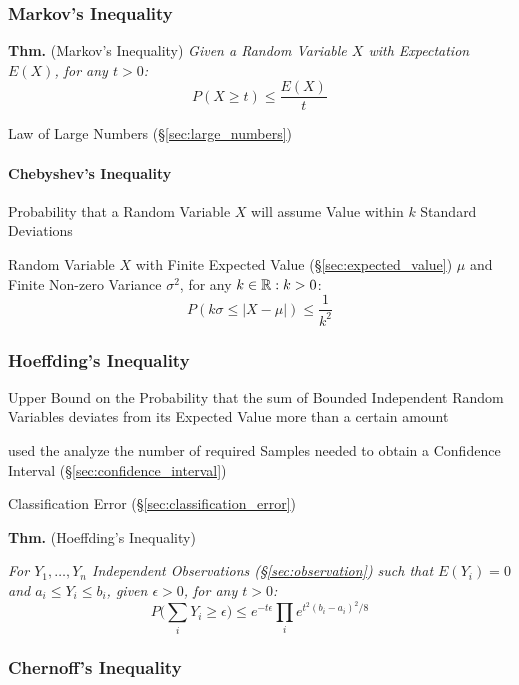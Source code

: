 \subsubsection{Markov's Inequality}\label{sec:markovs_inequality}

\textbf{Thm.} (Markov's Inequality) \emph{
  Given a Random Variable $X$ with Expectation $E(X)$, for any $t > 0$:
  \[
    P(X \geq t) \leq \frac{E(X)}{t}
  \]
}

Law of Large Numbers (\S\ref{sec:large_numbers})



\paragraph{Chebyshev's Inequality}\label{sec:chebyshevs_inequality}\hfill

Probability that a Random Variable $X$ will assume Value within $k$ Standard
Deviations

Random Variable $X$ with Finite Expected Value (\S\ref{sec:expected_value})
$\mu$ and Finite Non-zero Variance $\sigma^2$, for any $k \in \mathbb{R} : k > 0$:
\[
  P(k\sigma \leq |X - \mu|) \leq \frac{1}{k^2}
\]



\subsubsection{Hoeffding's Inequality}\label{sec:hoeffdings_inequality}

Upper Bound on the Probability that the sum of Bounded Independent Random
Variables deviates from its Expected Value more than a certain amount

used the analyze the number of required Samples needed to obtain a Confidence
Interval (\S\ref{sec:confidence_interval})

\fist Classification Error (\S\ref{sec:classification_error})

\textbf{Thm.} (Hoeffding's Inequality)

\emph{
  For $Y_1, \ldots, Y_n$ Independent Observations (\S\ref{sec:observation}) such
  that $E(Y_i) = 0$ and $a_i \leq Y_i \leq b_i$, given $\epsilon > 0$, for any
  $t > 0$:
  \[
    P\Big(\sum_i Y_i \geq \epsilon\Big) \leq
      e^{-t\epsilon} \prod_i e^{t^2(b_i - a_i)^2/8}
  \]
}



\subsubsection{Chernoff's Inequality}\label{sec:chernoffs_inequality}

